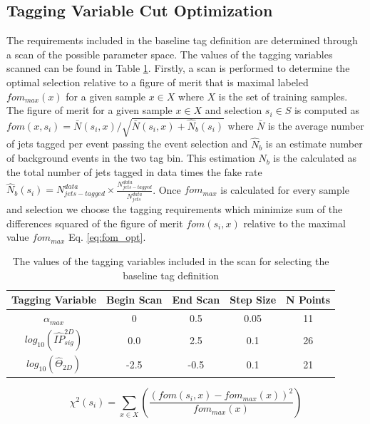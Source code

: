 \subsection{Tagging Variable Cut Optimization}

The requirements included in the baseline tag definition are determined through a scan of the possible parameter space. The values
of the tagging variables scanned can be found in Table \ref{tab:scan_space}. Firstly, a scan is performed to determine the optimal 
selection relative to a figure of merit that is maximal labeled $fom_{max}(x)$ for a given sample $x\in X$ where $X$ is the set of training samples.
The figure of merit for a given sample $x\in X$ and selection $s_{i} \in S$ is computed as $fom(x,s_i) = \bar{N}(s_i,x)/ \sqrt{\bar{N}(s_i,x) + \hat{N}_b(s_i)}$ where 
$\bar{N}$ is the average number of jets tagged per event passing the event selection and $\hat{N}_{b}$ is an estimate number of background events
 in the two tag bin. This estimation $\hat{N}_b$ is the  calculated as the total number of jets tagged in data times the fake rate $\hat{N}_{b}(s_i) = N^{data}_{jets-tagged} \times \frac{N_{jets-tagged}^{data}}{N_{jets}^{data}}$.  
Once $fom_{max}$ is calculated for every sample and selection we choose the tagging requirements which minimize sum of the differences squared of the figure of merit
$fom(s_i,x)$ relative to the maximal value $fom_{max}$  Eq. \ref{eq:fom_opt}.

\begin{table}
\caption{The values of the tagging variables included in the scan for selecting the baseline tag definition  \label{tab:scan_space}}
\begin{center}
\begin{tabular}{|c|c|c|c|c|}
\hline 
\textbf{Tagging Variable} & \textbf{Begin Scan} & \textbf{End Scan} & \textbf{Step Size} & \textbf{N Points}\\
\hline 
$\alpha_{max}$  & 0 &  0.5 & 0.05 & 11\\
\hline 
$log_{10}(\hat{IP}^{2D}_{sig})$  & 0.0 & 2.5 & 0.1 & 26\\
\hline 
$log_{10}(\hat{\Theta}_{2D})$  &  -2.5 & -0.5 & 0.1 & 21 \\
\hline 
\end{tabular}
\end{center}
\end{table}

\begin{equation}
\chi^2(s_i)  =  \sum_{x\in X} \left (\frac{(fom(s_i,x) - fom_{max}(x))^{2}}{ fom_{max}(x)} \right)
\label{eq:fom_opt}
\end{equation}

